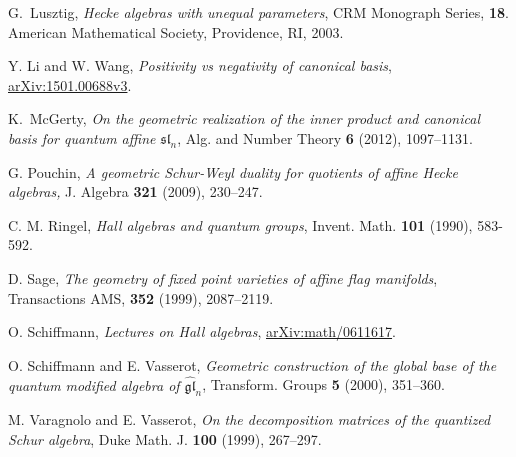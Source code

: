 \documentclass[12pt,reqno]{amsart}
\numberwithin{equation}{section}
\theoremstyle{definition}
\theoremstyle{plain}
\begin{document}
\begin{thebibliography}{DDPW08}
G.~Lusztig,
{\em Hecke algebras with unequal parameters},
CRM Monograph Series, {\bf 18}. American Mathematical Society, Providence, RI, 2003.

Y. Li and W. Wang,
{\em Positivity vs negativity of canonical basis},
\href{http://arxiv.org/abs/1501.00688}{arXiv:1501.00688v3}.

K.~McGerty,
{\em On the geometric realization of the inner product and canonical basis for quantum affine $\mathfrak{sl}_n$},
Alg. and Number Theory {\bf 6} (2012), 1097--1131.

G. Pouchin,
{\em A geometric Schur-Weyl duality for quotients of affine Hecke algebras,} 
J. Algebra {\bf  321}  (2009),   230--247. 

C. M. Ringel,
{\em Hall algebras and quantum groups}, 
Invent. Math. {\bf 101} (1990), 583-592.
        
D. Sage,
{\em The geometry of fixed point varieties of affine flag manifolds},
Transactions AMS, {\bf 352} (1999), 2087--2119.

O. Schiffmann,
{\em Lectures on Hall algebras},
\href{http://arxiv.org/abs/math/0611617}{arXiv:math/0611617}.

        
O. Schiffmann and E. Vasserot, {\em Geometric construction of the 
global base of the quantum modified algebra of $\widehat{ \mathfrak{gl}}_n$}, Transform. Groups {\bf 5} (2000), 351--360.

M. Varagnolo and E. Vasserot,  
{\em On the decomposition matrices of the quantized Schur algebra}, 
Duke Math. J. {\bf 100} (1999), 267--297.

\end{thebibliography}
\end{document}
